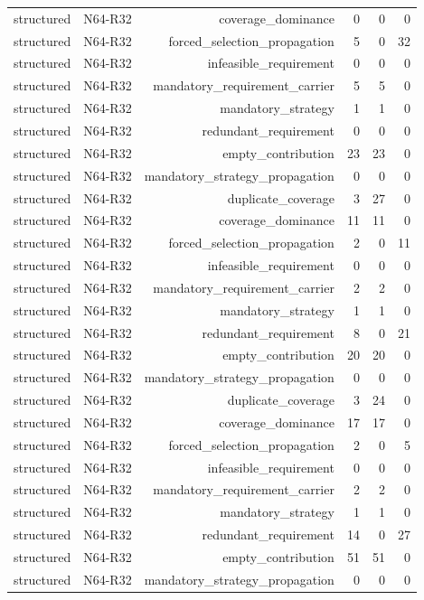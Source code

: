 {\begin{longtable}{lrrrrr}
structured & N64-R32 & coverage\_dominance & 0 & 0 & 0 \\
structured & N64-R32 & forced\_selection\_propagation & 5 & 0 & 32 \\
structured & N64-R32 & infeasible\_requirement & 0 & 0 & 0 \\
structured & N64-R32 & mandatory\_requirement\_carrier & 5 & 5 & 0 \\
structured & N64-R32 & mandatory\_strategy & 1 & 1 & 0 \\
structured & N64-R32 & redundant\_requirement & 0 & 0 & 0 \\
structured & N64-R32 & empty\_contribution & 23 & 23 & 0 \\
structured & N64-R32 & mandatory\_strategy\_propagation & 0 & 0 & 0 \\
structured & N64-R32 & duplicate\_coverage & 3 & 27 & 0 \\
structured & N64-R32 & coverage\_dominance & 11 & 11 & 0 \\
structured & N64-R32 & forced\_selection\_propagation & 2 & 0 & 11 \\
structured & N64-R32 & infeasible\_requirement & 0 & 0 & 0 \\
structured & N64-R32 & mandatory\_requirement\_carrier & 2 & 2 & 0 \\
structured & N64-R32 & mandatory\_strategy & 1 & 1 & 0 \\
structured & N64-R32 & redundant\_requirement & 8 & 0 & 21 \\
structured & N64-R32 & empty\_contribution & 20 & 20 & 0 \\
structured & N64-R32 & mandatory\_strategy\_propagation & 0 & 0 & 0 \\
structured & N64-R32 & duplicate\_coverage & 3 & 24 & 0 \\
structured & N64-R32 & coverage\_dominance & 17 & 17 & 0 \\
structured & N64-R32 & forced\_selection\_propagation & 2 & 0 & 5 \\
structured & N64-R32 & infeasible\_requirement & 0 & 0 & 0 \\
structured & N64-R32 & mandatory\_requirement\_carrier & 2 & 2 & 0 \\
structured & N64-R32 & mandatory\_strategy & 1 & 1 & 0 \\
structured & N64-R32 & redundant\_requirement & 14 & 0 & 27 \\
structured & N64-R32 & empty\_contribution & 51 & 51 & 0 \\
structured & N64-R32 & mandatory\_strategy\_propagation & 0 & 0 & 0 \\

\end{longtable}}
